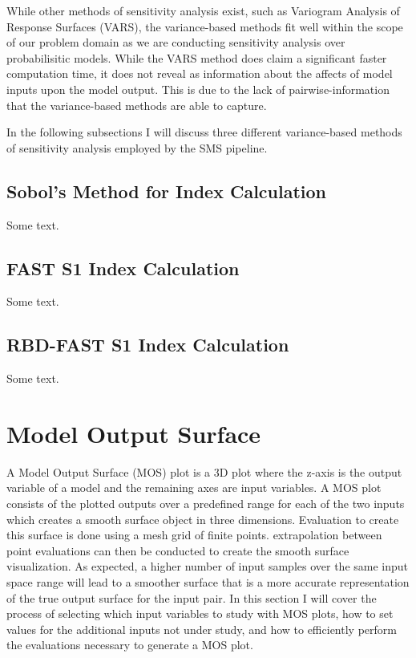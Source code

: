While other methods of sensitivity analysis exist, such as Variogram Analysis of Response Surfaces (VARS), the variance-based methods fit well within the scope of our problem domain as we are conducting sensitivity analysis over probabilisitic models. While the VARS method does claim a significant faster computation time, it does not reveal as information about the affects of model inputs upon the model output. This is due to the lack of pairwise-information that the variance-based methods are able to capture.

In the following subsections I will discuss three different variance-based methods of sensitivity analysis employed by the SMS pipeline.

\subsection{Sobol's Method for Index Calculation\label{sec:sobol_analysis}}
Some text.

\subsection{FAST S1 Index Calculation\label{sec:fast_analysis}}
Some text.

\subsection{RBD-FAST S1 Index Calculation\label{sec:rbd_fast_analysis}}
Some text.


\section{Model Output Surface\label{sec:out_surf}}
A Model Output Surface (MOS) plot is a 3D plot where the z-axis is the output variable of a model and the remaining axes are input variables. A MOS plot consists of the plotted outputs over a predefined range for each of the two inputs which creates a smooth surface object in three dimensions. Evaluation to create this surface is done using a mesh grid of finite points. extrapolation between point evaluations can then be conducted to create the smooth surface visualization. As expected, a higher number of input samples over the same input space range will lead to a smoother surface that is a more accurate representation of the true output surface for the input pair. In this section I will cover the process of selecting which input variables to study with MOS plots, how to set values for the additional inputs not under study, and how to efficiently perform the evaluations necessary to generate a MOS plot.


